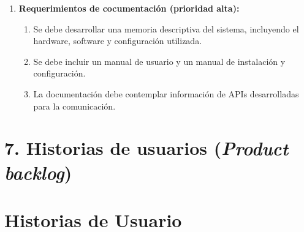 \documentclass[
11pt, %
]{charter}
\begin{document}
\begin{enumerate}
    \item \textbf{Requerimientos de cocumentación (prioridad alta):}
    \begin{enumerate}
        \item Se debe desarrollar una memoria descriptiva del sistema, incluyendo el hardware, software y configuración utilizada.
        \item Se debe incluir un manual de usuario y un manual de instalación y configuración. 
        \item La documentación debe contemplar información de APIs desarrolladas para la comunicación. 
    \end{enumerate}

\end{enumerate}




\section{7. Historias de usuarios (\textit{Product backlog})}
\label{sec:backlog}

\section{Historias de Usuario}
\end{document}
